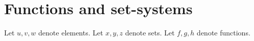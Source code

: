 \documentclass[../../set-theory.ftl.tex]{subfiles}
\begin{document}
  \section{Functions and set-systems}

  \begin{forthel}
  \end{forthel}

  \begin{forthel}
  \end{forthel}

  \begin{forthel}
  Let $u,v,w$ denote elements.
  Let $x,y,z$ denote sets.
  Let $f,g,h$ denote functions.
  \end{forthel}
\end{document}

